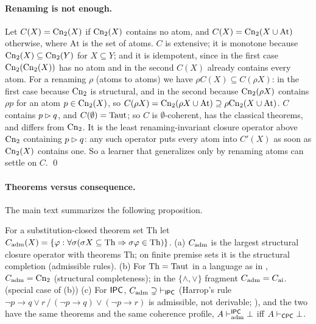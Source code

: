 \paragraph{Renaming is not enough.} Let $C(X)=\mathrm{Cn}_2(X)$ if $\mathrm{Cn}_2(X)$ contains no atom, and $C(X)=\mathrm{Cn}_2(X\cup\mathrm{At})$ otherwise, where $\mathrm{At}$ is the set of atoms. $C$ is extensive; it is monotone because $\mathrm{Cn}_2(X)\subseteq\mathrm{Cn}_2(Y)$ for $X\subseteq Y$; and it is idempotent, since in the first case $\mathrm{Cn}_2(\mathrm{Cn}_2(X))$ has no atom and in the second $C(X)$ already contains every atom. For a renaming $\rho$ (atoms to atoms) we have $\rho C(X)\subseteq C(\rho X)$: in the first case because $\mathrm{Cn}_2$ is structural, and in the second because $\mathrm{Cn}_2(\rho X)$ contains $\rho p$ for an atom $p\in\mathrm{Cn}_2(X)$, so $C(\rho X)=\mathrm{Cn}_2(\rho X\cup\mathrm{At})\supseteq\rho\mathrm{Cn}_2(X\cup\mathrm{At})$. $C$ contains $p\rhd q$, and $C(\emptyset)=\mathrm{Taut}$; so $C$ is $\emptyset$-coherent, has the classical theorems, and differs from $\mathrm{Cn}_2$. It is the least renaming-invariant closure operator above $\mathrm{Cn}_2$ containing $p\rhd q$: any such operator puts every atom into $C'(X)$ as soon as $\mathrm{Cn}_2(X)$ contains one. So a learner that generalizes only by renaming atoms can settle on $C$. \qed

\paragraph{Theorems versus consequence.} The main text summarizes the following proposition.

\begin{proposition}\label{prop:coherence:adm}
For a substitution-closed theorem set $\mathrm{Th}$ let $C_{\mathrm{adm}}(X)=\{\varphi:\forall\sigma(\sigma X\subseteq\mathrm{Th}\Rightarrow\sigma\varphi\in\mathrm{Th})\}$.
\textup{(a)} $C_{\mathrm{adm}}$ is the largest structural closure operator with theorems $\mathrm{Th}$; on finite premise sets it is the structural completion (admissible rules).
\textup{(b)} For $\mathrm{Th}=\mathrm{Taut}$ in a language as in , $C_{\mathrm{adm}}=\mathrm{Cn}_2$ (structural completeness); in the $\{\wedge,\vee\}$ fragment $C_{\mathrm{adm}}=C_{\mathrm{ai}}$. \hfill{} (special case of (b))
\textup{(c)} For $\mathsf{IPC}$, $C_{\mathrm{adm}}\supsetneq{\vdash_{\mathsf{IPC}}}$ (Harrop's rule $\neg p\to q\vee r\,/\,(\neg p\to q)\vee(\neg p\to r)$ is admissible, not derivable; \citealt{harrop1960concerning,rybakov1997admissibility,iemhoff2001admissible}), and the two have the same theorems and the same coherence profile, $A\vdash^{\mathsf{IPC}}_{\mathrm{adm}}\bot$ iff $A\vdash_{\mathsf{CPC}}\bot$.
\end{proposition}


